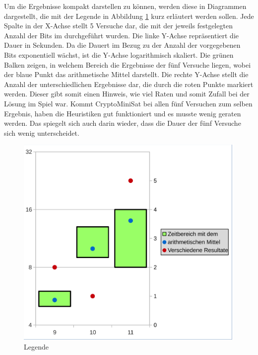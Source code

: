 Um die Ergebnisse kompakt darstellen zu können, werden diese in Diagrammen dargestellt, die mit der Legende in Abbildung \ref{fig:data_lengede}
kurz erläutert werden sollen. Jede Spalte in der X-Achse stellt 5 Versuche dar, die mit der jeweils festgelegten Anzahl der Bits im 
durchgeführt wurden. Die linke Y-Achse repräsentiert die Dauer in Sekunden. Da die Dauert im Bezug zu der Anzahl der vorgegebenen Bits exponentiell
wächst, ist die Y-Achse logarithmisch skaliert. Die grünen Balken zeigen, in welchem Bereich die Ergebnisse der fünf Versuche liegen, wobei
der blaue Punkt das arithmetische Mittel darstellt. Die rechte Y-Achse stellt die Anzahl der unterschiedlichen Ergebnisse dar, die durch die
roten Punkte markiert werden. Dieser gibt somit einen Hinweis, wie viel Raten und somit Zufall bei der Lösung im Spiel war. Kommt CryptoMiniSat
bei allen fünf Versuchen zum selben Ergebnis, haben die Heuristiken gut funktioniert und es musste wenig geraten werden. Das spiegelt sich auch
darin wieder, dass die Dauer der fünf Versuche sich wenig unterscheidet.
\begin{figure}[!h]
  \centering
  \includegraphics[scale=0.55]{images/data_legend}
  \caption{Legende}
  \label{fig:data_lengede}
\end{figure}

